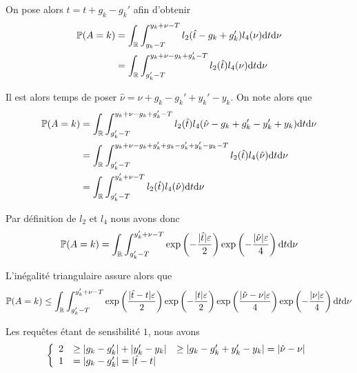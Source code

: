 On pose alors \(\hat t = t + g_k - g_k'\) afin d'obtenir 
\begin{align*}
    \mathbb P(A = k) & = \int_{\mathbb{R}}\int_{g_k- T}^{y_k + \nu - T} l_2(\hat t - g_k + g_k')l_4(\nu) \mathrm{d}  t \mathrm{d} \nu\\
    & = \int_{\mathbb{R}}\int_{g_k' - T}^{y_k + \nu - g_k + g_k' - T} l_2(\hat t )l_4(\nu) \mathrm{d}  t \mathrm{d} \nu\\
\end{align*}

Il est alors temps de poser \(\hat \nu = \nu + g_k - g_k' + y_k' - y_k  \). On note alors que 
\begin{align*}
    \mathbb P(A = k) & = \int_{\mathbb{R}}\int_{g_k' - T}^{y_k + \nu - g_k + g_k' - T} l_2(\hat t )l_4(\hat\nu - g_k + g_k' - y_k' + y_k) \mathrm{d} t \mathrm{d} \nu\\
    & = \int_{\mathbb{R}}\int_{g_k' - T}^{y_k + \nu  - g_k +g_k'  + g_k - g_k' +y_k' - y_k - T} l_2(\hat t )l_4(\hat\nu) \mathrm{d}  t \mathrm{d} \nu\\
    & = \int_{\mathbb{R}}\int_{g_k' - T }^{y_k' + \nu - T } l_2(\hat t )l_4(\hat\nu) \mathrm{d} t \mathrm{d} \nu\\
\end{align*}

Par définition de \(l_2\) et \(l_4\) nous avons donc
\begin{align*}
    \mathbb P(A = k) & =  \int_{\mathbb{R}}\int_{g_k' - T}^{y_k' + \nu -T} \exp\left(-\dfrac{|\hat t|\varepsilon}{2}\right)\exp\left(-\dfrac{|\hat\nu|\varepsilon}{4}\right) \mathrm{d} t \mathrm{d} \nu\\
\end{align*}

L'inégalité triangulaire assure alors que 
\begin{align*}
    \mathbb P(A = k) & \leq  \int_{\mathbb{R}}\int_{g_k' - T}^{y_k' + \nu - T } \exp\left(\dfrac{|\hat t - t|\varepsilon}{2}\right)\exp\left(-\dfrac{|t|\varepsilon}{2}\right)\exp\left(\dfrac{|\hat\nu - \nu|\varepsilon}{4}\right)\exp\left(-\dfrac{|\nu|\varepsilon}{4}\right) \mathrm{d} t \mathrm{d} \nu\\
\end{align*}

Les requêtes étant de sensibilité \(1\), nous avons 
\[
    \left\{ 
        \begin{array}[]{rlc}
            2 & \geq |g_k - g_k'| + |y_k' - y_k | & \geq|g_k - g_k' + y_k' - y_k | = |\hat\nu - \nu|\\
            1 & = | g_k - g_k' | = |\hat t - t|\\
        \end{array}
    \right.    
\]

